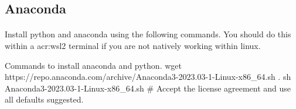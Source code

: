 \subsection{Anaconda}
    \paragraph{}
    Install python and anaconda using the following commands. You should do this within a \gls{acr:wsl2} terminal if you are not natively working within linux.
    \begin{bashcmd}[label=listing:ANACONDAINST]{Commands to install anaconda and python.}
    wget https://repo.anaconda.com/archive/Anaconda3-2023.03-1-Linux-x86_64.sh .
    sh Anaconda3-2023.03-1-Linux-x86_64.sh
    # Accept the license agreement and use all defaults suggested.
    \end{bashcmd}